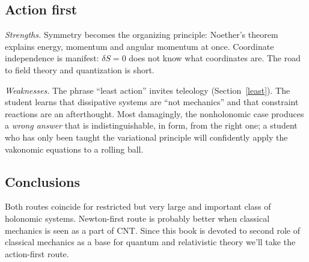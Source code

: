 \subsection{Action first}

\emph{Strengths.} Symmetry becomes the organizing principle:
Noether's theorem explains energy, momentum and angular momentum at once.
Coordinate independence is manifest: $\delta S=0$ does not know what
coordinates are. The road to field theory and quantization is short.

\emph{Weaknesses.} The phrase ``least action'' invites teleology
(Section~\ref{least}). The student learns that dissipative systems are
``not mechanics'' and that constraint reactions are an afterthought. Most
damagingly, the nonholonomic case produces a \emph{wrong answer} that is
indistinguishable, in form, from the right one; a student who has only
been taught the variational principle will confidently apply the vakonomic
equations to a rolling ball.

\subsection{Conclusions}

Both routes coincide for restricted but very large and important class of
holonomic systems.  Newton-first route is probably better when classical 
mechanics is seen as a part of CNT. Since this book is devoted to second
role of classical mechanics as a base for quantum and relativistic theory
we'll take the action-first route.
